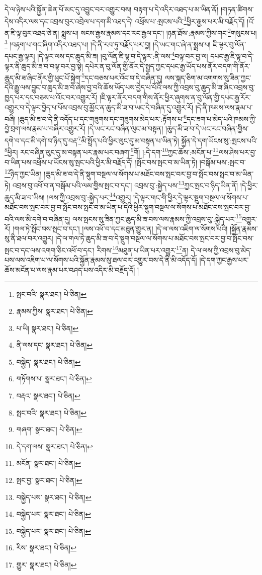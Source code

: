 དེ་ལ་ཉེས་པའི་སྐྱོན་ཆེན་པོ་མང་དུ་འབྱུང་བར་འགྱུར་བས། བརྟག་པ་དེ་འདིར་འཐད་པ་མ་ཡིན་ནོ། །གཏན་ཚིགས་དེས་འདིར་ལས་དང་འབྲས་བུར་འབྲེལ་པ་དག་མི་འཐད་དེ། འཕྲོས་པ་:སྤངས་པའི་\footnote{སྤང་བའི་  སྣར་ཐང་།  པེ་ཅིན། }ཕྱིར་རྒྱས་པར་མི་བརྗོད་དོ། །འོ་ན་ཇི་ལྟ་བུར་འཐད་ཅེ་ན། སྨྲས་པ། སངས་རྒྱས་རྣམས་དང་རང་རྒྱལ་དང་། །ཉན་ཐོས་:རྣམས་ཀྱིས་གང་\footnote{རྣམས་ཀྱིས་  སྣར་ཐང་།  པེ་ཅིན། }གསུངས་པ།\footnote{པ་ཡི།  སྣར་ཐང་།  པེ་ཅིན། } །བརྟག་པ་གང་ཞིག་འདིར་འཐད་པ། །དེ་ནི་རབ་ཏུ་བརྗོད་པར་བྱ། །དེ་ཡང་གང་ཞེ་ན་སྨྲས་པ། ཇི་ལྟར་བུ་ལོན་དཔང་རྒྱ་ལྟར། །དེ་ལྟར་ལས་དང་ཆུད་མི་ཟ། །བུ་ལོན་ཇི་ལྟ་བ་དེ་ལྟར་:ནི་ལས་\footnote{ནི་ལས་དང་  སྣར་ཐང་།  པེ་ཅིན། }བལྟ་བར་བྱ་ལ། དཔང་རྒྱ་ཇི་ལྟ་བ་དེ་ལྟར་ནི་ཆུད་མི་ཟ་བ་བལྟ་བར་བྱ་སྟེ། དཔེར་ན་བུ་ལོན་གྱི་ནོར་དེ་སྤྱད་ཀྱང་དཔང་རྒྱ་ཡོད་པས་ནོར་བདག་གི་ནོར་ཆུད་མི་ཟ་ཞིང་ནོར་གྱི་ཕུང་པོ་སྐྱེག་\footnote{བསྐྱེད་  སྣར་ཐང་།  པེ་ཅིན། }དང་བཅས་པར་འོང་བ་དེ་བཞིན་དུ། ལས་སྐད་ཅིག་མ་འགགས་སུ་ཟིན་ཀྱང་དེའི་རྒྱུ་ལས་བྱུང་བ་ཆུད་མི་ཟ་བ་ཞེས་བྱ་བའི་ཆོས་ཡོད་པས་བྱེད་པ་པོའི་ལས་ཀྱི་འབྲས་བུ་ཆུད་མི་ཟ་ཞིང་འབྲས་བུ་ཁྱད་པར་དང་བཅས་པ་འོང་བར་འགྱུར་རོ། །ཇི་ལྟར་ནོར་བདག་གིས་ནོར་ཕྱིར་ཞུགས་ན་བུ་ལོན་གྱི་དཔང་རྒྱ་རོར་འགྱུར་བ་དེ་ལྟར་བྱེད་པ་པོས་འབྲས་བུ་མྱོང་ན་ཆུད་མི་ཟ་བ་ཡང་དེ་བཞིན་དུ་འགྱུར་རོ། །དེ་ནི་ཁམས་ལས་རྣམ་པ་བཞི། །ཆུད་མི་ཟ་བ་དེ་ནི་འདོད་པ་དང་གཟུགས་དང་གཟུགས་མེད་པར་:རྟོགས་པ་\footnote{གཏོགས་པ་  སྣར་ཐང་།  པེ་ཅིན། }དང་ཟག་པ་མེད་པའི་ཁམས་ཀྱི་བྱེ་བྲག་ལས་རྣམ་པ་བཞིར་འགྱུར་རོ། །དེ་ཡང་རང་བཞིན་ལུང་མ་བསྟན། །ཆུད་མི་ཟ་བ་དེ་ཡང་རང་བཞིན་གྱིས་དགེ་བ་དང་མི་དགེ་བ་ཉིད་དུ་བརྡ་\footnote{བརྡའ་  སྣར་ཐང་།  པེ་ཅིན། }མི་སྤྲོད་པའི་ཕྱིར་ལུང་དུ་མ་བསྟན་པ་ཡིན་ཏེ། སྐྱོན་དེ་དག་ཡོངས་སུ་:སྤངས་པའི་\footnote{སྤང་བའི་  སྣར་ཐང་།  པེ་ཅིན། }ཕྱིར། རང་བཞིན་ལུང་དུ་མ་བསྟན་པར་རྣམ་པར་བཞག་\footnote{གཞག་  སྣར་ཐང་།  པེ་ཅིན། }གོ། །:དེ་དག་\footnote{དེ་དག་ལས་  སྣར་ཐང་།  པེ་ཅིན། }ཀྱང་ཆོས་:མངོན་པ་\footnote{མངོན་  སྣར་ཐང་།  པེ་ཅིན། }ལས་ཤེས་པར་བྱ་བ་ཡིན་པས་འཕྲོས་པ་ཡོངས་སུ་སྤང་པའི་ཕྱིར་མི་བརྗོད་དོ། །སྤོང་བས་སྤང་བ་མ་ཡིན་ཏེ། །བསྒོམ་པས་:སྤང་བ་\footnote{སྤང་བྱ་  སྣར་ཐང་།  པེ་ཅིན། }ཉིད་ཀྱང་ཡིན། །ཆུད་མི་ཟ་བ་དེ་ནི་སྡུག་བསྔལ་ལ་སོགས་པ་མཐོང་བས་སྤང་བར་བྱ་བ་སྤོང་བས་སྤང་བ་མ་ཡིན་ཏེ། འབྲས་བུ་འཕོ་བ་ན་བསྒོམ་པའི་ལམ་གྱིས་སྤང་བ་དང་། འབྲས་བུ་:སྐྱེད་པས་\footnote{བསྐྱེད་པས་  སྣར་ཐང་།  པེ་ཅིན། }ཀྱང་སྤང་བ་ཉིད་ཡིན་ནོ། །དེ་ཕྱིར་ཆུད་མི་ཟ་བ་ཡིས། །ལས་ཀྱི་འབྲས་བུ་:སྐྱེད་པར་\footnote{བསྐྱེད་པར་  སྣར་ཐང་།  པེ་ཅིན། }འགྱུར། །དེ་ལྟར་གང་གི་ཕྱིར་དེ་ལྟར་སྡུག་བསྔལ་ལ་སོགས་པ་མཐོང་བས་སྤང་བར་བྱ་བ་སྤོང་བས་སྤང་བ་མ་ཡིན་པ་དེའི་ཕྱིར་སྡུག་བསྔལ་ལ་སོགས་པ་མཐོང་བས་སྤང་བར་བྱ་བའི་ལས་མི་དགེ་བ་བཞིན་དུ། ལས་སྤངས་སུ་ཟིན་ཀྱང་ཆུད་མི་ཟ་བས་ལས་རྣམས་ཀྱི་འབྲས་བུ་:སྐྱེད་པར་\footnote{བསྐྱེད་པར་  སྣར་ཐང་།  པེ་ཅིན། }འགྱུར་རོ། །གལ་ཏེ་སྤོང་བས་སྤང་བ་དང་། །ལས་འཕོ་བ་དང་མཐུན་གྱུར་ན། །དེ་ལ་ལས་འཇིག་ལ་སོགས་པའི། །སྐྱོན་རྣམས་སུ་ནི་ཐལ་བར་འགྱུར། །དེ་ལ་གལ་ཏེ་ཆུད་མི་ཟ་བ་དེ་སྡུག་བསྔལ་ལ་སོགས་པ་མཐོང་བས་སྤང་བར་བྱ་བ་སྤོང་བས་སྤང་བ་དང་ལས་འགག་ཅིང་འཕོ་བ་དང་། རིགས་\footnote{རིས་  སྣར་ཐང་།  པེ་ཅིན། }མཐུན་པ་ཡིན་པར་འགྱུར་\footnote{གྱུར་  སྣར་ཐང་།  པེ་ཅིན། }ན། དེ་ལ་ལས་ཀྱི་འབྲས་བུ་མེད་པས་ལས་འཇིག་པ་ལ་སོགས་པའི་སྐྱོན་རྣམས་སུ་ཐལ་བར་འགྱུར་བས་དེ་ནི་མི་འདོད་དོ། །དེ་དག་ཀྱང་རྒྱས་པར་ཆོས་མངོན་པ་ལས་རྣམ་པར་བཤད་པས་འདིར་མི་བརྗོད་དོ། །
